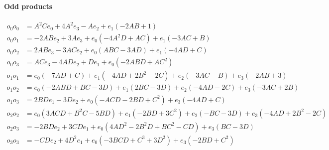\paragraph{Odd products}
\begin{align}
o_0 o_0 &=A^{2} C e_{0} + 4 A^{2} e_{3} - A e_{2} + e_{1} \left(- 2 A B + 1\right)\tag{GB15a}\\
o_0 o_1 &=- 2 A B e_{2} + 3 A e_{3} + e_{0} \left(- 4 A^{2} D + A C\right) + e_{1} \left(- 3 A C + B\right)\tag{GB15b}\\
o_0 o_2 &=2 A B e_{3} - 3 A C e_{2} + e_{0} \left(A B C - 3 A D\right) + e_{1} \left(- 4 A D + C\right)\tag{GB15c}\\
o_0 o_3 &=A C e_{3} - 4 A D e_{2} + D e_{1} + e_{0} \left(- 2 A B D + A C^{2}\right)\tag{GB15d}\\
o_1 o_1 &=e_{0} \left(- 7 A D + C\right) + e_{1} \left(- 4 A D + 2 B^{2} - 2 C\right) + e_{2} \left(- 3 A C - B\right) + e_{3} \left(- 2 A B + 3\right)\tag{GB15e}\\
o_1 o_2 &=e_{0} \left(- 2 A B D + B C - 3 D\right) + e_{1} \left(2 B C - 3 D\right) + e_{2} \left(- 4 A D - 2 C\right) + e_{3} \left(- 3 A C + 2 B\right)\tag{GB15f}\\
o_1 o_3 &=2 B D e_{1} - 3 D e_{2} + e_{0} \left(- A C D - 2 B D + C^{2}\right) + e_{3} \left(- 4 A D + C\right)\tag{GB15g}\\
o_2 o_2 &=e_{0} \left(3 A C D + B^{2} C - 5 B D\right) + e_{1} \left(- 2 B D + 3 C^{2}\right) + e_{2} \left(- B C - 3 D\right) + e_{3} \left(- 4 A D + 2 B^{2} - 2 C\right)\tag{GB15h}\\
o_2 o_3 &=- 2 B D e_{2} + 3 C D e_{1} + e_{0} \left(4 A D^{2} - 2 B^{2} D + B C^{2} - C D\right) + e_{3} \left(B C - 3 D\right)\tag{GB15i}\\
o_3 o_3 &=- C D e_{2} + 4 D^{2} e_{1} + e_{0} \left(- 3 B C D + C^{3} + 3 D^{2}\right) + e_{3} \left(- 2 B D + C^{2}\right)\tag{GB15j}
\end{align}

